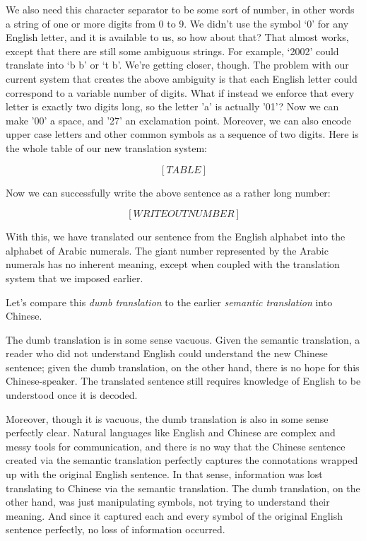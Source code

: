 \documentclass{book}
\begin{document}
We also need this character separator to be some sort of number, in other words a string of one or more digits from 0 to 9. We didn't use the symbol `0' for any English letter, and it is available to us, so how about that? That almost works, except that there are still some ambiguous strings. For example, `2002' could translate into `b  b' or `t b'. We're getting closer, though. The problem with our current system that creates the above ambiguity is that each English letter could correspond to a variable number of digits. What if instead we enforce that every letter is exactly two digits long, so the letter 'a' is actually '01'? Now we can make '00' a space, and '27' an exclamation point. Moreover, we can also encode upper case letters and other common symbols as a sequence of two digits. Here is the whole table of our new translation system:

\[ [TABLE] \]

Now we can successfully write the above sentence as a rather long number:

\[ [WRITE OUT NUMBER] \]

With this, we have translated our sentence from the English alphabet into the alphabet of Arabic numerals. The giant number represented by the Arabic numerals has no inherent meaning, except when coupled with the translation system that we imposed earlier.

Let's compare this \emph{dumb translation} to the earlier \emph{semantic translation} into Chinese.

The dumb translation is in some sense vacuous. Given the semantic translation, a reader who did not understand English could understand the new Chinese sentence; given the dumb translation, on the other hand, there is no hope for this Chinese-speaker. The translated sentence still requires knowledge of English to be understood once it is decoded.

Moreover, though it is vacuous, the dumb translation is also in some sense perfectly clear. Natural languages like English and Chinese are complex and messy tools for communication, and there is no way that the Chinese sentence created via the semantic translation perfectly captures the connotations wrapped up with the original English sentence. In that sense, information was lost translating to Chinese via the semantic translation. The dumb translation, on the other hand, was just manipulating symbols, not trying to understand their meaning. And since it captured each and every symbol of the original English sentence perfectly, no loss of information occurred.
\end{document}
